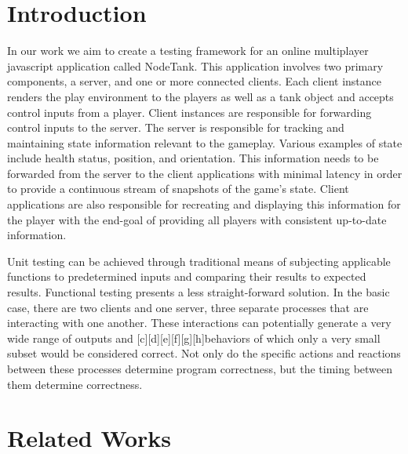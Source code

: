 \documentclass[conference]{IEEEtran}
\begin{document}
\section{Introduction}
In our work we aim to create a testing framework for an online multiplayer javascript application called NodeTank. This application involves two primary components, 
a server, and one or more connected clients. Each client instance renders the play environment to the players as well as a tank object and accepts control inputs from 
a player. Client instances are responsible for forwarding control inputs to the server. The server is responsible for tracking and maintaining state information relevant 
to the gameplay. Various examples of state include health status, position, and orientation. This information needs to be forwarded from the server to the client applications 
with minimal latency in order to provide a continuous stream of snapshots of the game’s state. Client applications are also responsible for recreating and displaying this 
information for the player with the end-goal of providing all players with consistent up-to-date information.

Unit testing can be achieved through traditional means of subjecting applicable functions to predetermined inputs and comparing their results to expected results. 
Functional testing presents a less straight-forward solution. In the basic case, there are two clients and one server, three separate processes that are interacting 
with one another. These interactions can potentially generate a very wide range of outputs and [c][d][e][f][g][h]behaviors of which only a very small subset would be 
considered correct. Not only do the specific actions and reactions between these processes determine program correctness, but the timing between them determine correctness.

\section{Related Works}
\end{document}

